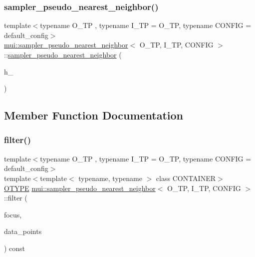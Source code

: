 \subsubsection{\texorpdfstring{sampler\+\_\+pseudo\+\_\+nearest\+\_\+neighbor()}{sampler\_pseudo\_nearest\_neighbor()}}
{\footnotesize\ttfamily template$<$typename O\+\_\+\+TP , typename I\+\_\+\+TP  = O\+\_\+\+TP, typename C\+O\+N\+F\+IG  = default\+\_\+config$>$ \\
\hyperlink{classmui_1_1sampler__pseudo__nearest__neighbor}{mui\+::sampler\+\_\+pseudo\+\_\+nearest\+\_\+neighbor}$<$ O\+\_\+\+TP, I\+\_\+\+TP, C\+O\+N\+F\+IG $>$\+::\hyperlink{classmui_1_1sampler__pseudo__nearest__neighbor}{sampler\+\_\+pseudo\+\_\+nearest\+\_\+neighbor} (\begin{DoxyParamCaption}\item[{\hyperlink{classmui_1_1sampler__pseudo__nearest__neighbor_ab053986c2affe4523f82f14e832a259e}{R\+E\+AL}}]{h\+\_\+ }\end{DoxyParamCaption})\hspace{0.3cm}{\ttfamily [inline]}}



\subsection{Member Function Documentation}
\mbox{\label{classmui_1_1sampler__pseudo__nearest__neighbor_ae5afa7d2d942853facbf71f067b8bc30}} 
\subsubsection{\texorpdfstring{filter()}{filter()}}
{\footnotesize\ttfamily template$<$typename O\+\_\+\+TP , typename I\+\_\+\+TP  = O\+\_\+\+TP, typename C\+O\+N\+F\+IG  = default\+\_\+config$>$ \\
template$<$template$<$ typename, typename $>$ class C\+O\+N\+T\+A\+I\+N\+ER$>$ \\
\hyperlink{classmui_1_1sampler__pseudo__nearest__neighbor_a4e8f628c3c9ba7a0a265f19077c32983}{O\+T\+Y\+PE} \hyperlink{classmui_1_1sampler__pseudo__nearest__neighbor}{mui\+::sampler\+\_\+pseudo\+\_\+nearest\+\_\+neighbor}$<$ O\+\_\+\+TP, I\+\_\+\+TP, C\+O\+N\+F\+IG $>$\+::filter (\begin{DoxyParamCaption}\item[{\hyperlink{classmui_1_1sampler__pseudo__nearest__neighbor_ab639810d9409c0e3fea48d950d6cfe59}{point\+\_\+type}}]{focus,  }\item[{const C\+O\+N\+T\+A\+I\+N\+ER$<$ \hyperlink{classmui_1_1sampler__pseudo__nearest__neighbor_a02306f1df2d4fa21d58a35b4466a3ac5}{I\+T\+Y\+PE}, C\+O\+N\+F\+IG $>$ \&}]{data\+\_\+points }\end{DoxyParamCaption}) const\hspace{0.3cm}{\ttfamily [inline]}}

